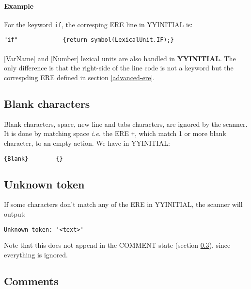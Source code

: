 \documentclass[letterpaper]{article}
\begin{document}
\paragraph{Example}

For the keyword \texttt{if}, the corresping ERE line in YYINITIAL is:

\begin{lstlisting}[frame=single]
"if"             {return symbol(LexicalUnit.IF);}
\end{lstlisting}

\paragraph{}
[VarName] and [Number] lexical units are also handled in \textbf{YYINITIAL}.
The only difference is that the right-side of the line code is not a keyword
but the correspding ERE defined in section \ref{advanced-ere}.

\subsection{Blank characters}

Blank characters, space, new line and tabs characters,
are ignored by the scanner. It is
done by matching space \textit{i.e.} the ERE \texttt{\s+}, which match
1 or more blank character, to an empty action. We have in YYINITIAL:
\begin{lstlisting}[frame=single]
{Blank}        {}
\end{lstlisting}

\subsection{Unknown token}

If some characters don't match any of the ERE in YYINITIAL, the scanner
will output:

\begin{lstlisting}[frame=single]
Unknown token: '<text>'
\end{lstlisting}

Note that this does not append in the COMMENT state (section \ref{comment}),
since everything is ignored.

\subsection{Comments}
\label{comment}

\paragraph{}
\end{document}
